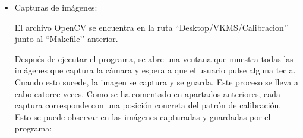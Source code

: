 \begin{itemize}
    \item Capturas de imágenes:
    
    El archivo OpenCV se encuentra en la ruta ``Desktop/VKMS/Calibracion’’ junto al ``Makefile’’ anterior. \\
    
    
Después de ejecutar el programa, se abre una ventana que muestra todas las imágenes que captura la cámara y espera a que el usuario pulse alguna tecla. Cuando esto sucede, la imagen se captura y se guarda. Este proceso se lleva a cabo catorce veces. Como se ha comentado en apartados anteriores, cada captura corresponde con una posición concreta del patrón de calibración. Esto se puede observar en las imágenes capturadas y guardadas por el programa: \\
    

\end{itemize}
